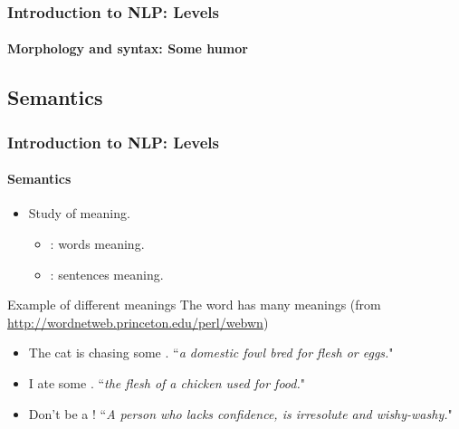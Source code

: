 \documentclass[xcolor=table]{beamer}
\begin{document}
\begin{frame}
\frametitle{Introduction to NLP: Levels}
\framesubtitle{Morphology and syntax: Some humor}

\begin{center}
\end{center}

\end{frame}

\subsection{Semantics}

\begin{frame}
\frametitle{Introduction to NLP: Levels}
\framesubtitle{Semantics}

\begin{itemize}
	\item Study of meaning.
	\begin{itemize}
		\item {}: words meaning.
		\item {}: sentences meaning.
	\end{itemize}
\end{itemize}

\begin{exampleblock}{Example of different meanings}
	The word  has many meanings (from \url{http://wordnetweb.princeton.edu/perl/webwn})
	\begin{itemize}
		\item The cat is chasing some . ``\textit{a domestic fowl bred for flesh or eggs.}"
		\item I ate some . ``\textit{the flesh of a chicken used for food.}"
		\item Don't be a ! ``\textit{A person who lacks confidence, is irresolute and wishy-washy.}"
	\end{itemize}
	
\end{exampleblock}

\end{frame}
\end{document}
